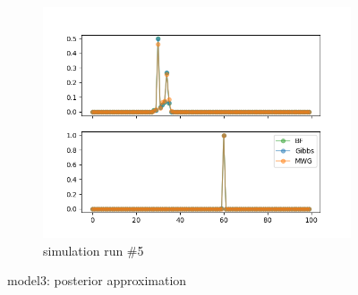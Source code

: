 \begin{figure}[H]
\begin{subfigure}{.3\textwidth}
    	\includegraphics[width=\linewidth]{../../plots/Posterior_post_burnin_M3_N100_NMCMC3_seed4_diffind2.png}
    	\caption{simulation run \#5}
	\end{subfigure}
	\caption{model3: posterior approximation}
\end{figure}

